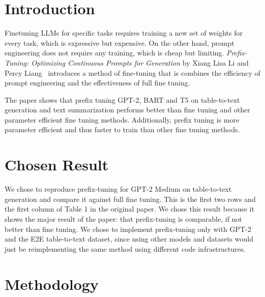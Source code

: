 \documentclass[11pt]{article} %
\author{Mac Turner, Michael Ngo, Eric Hu, Neeraj Parihar}
\begin{document}
\maketitle

\section{Introduction}
Finetuning LLMs for specific tasks requires training a new set of weights for every task, which is expressive but expensive. On the other hand, prompt engineering does not require any training, which is cheap but limiting. \textit{Prefix-Tuning: Optimizing Continuous Prompts for Generation} by Xiang Lisa Li and Percy Liang~\cite{li-liang-2021-prefix} introduces a method of fine-tuning that is combines the efficiency of prompt engineering and the effectiveness of full fine tuning.

The paper shows that prefix tuning GPT-2, BART and T5 on table-to-text generation and text summarization performs better than fine tuning and other parameter efficient fine tuning methods. Additionally, prefix tuning is more parameter efficient and thus faster to train than other fine tuning methods.

\section{Chosen Result}

We chose to reproduce prefix-tuning for GPT-2 Medium on table-to-text generation and compare it against full fine tuning. This is the first two rows and the first column of Table 1 in the original paper. We chose this result because it shows the major result of the paper: that prefix-tuning is comparable, if not better than fine tuning. We chose to implement prefix-tuning only with GPT-2 and the E2E table-to-text dataset, since using other models and datasets would just be reimplementing the same method using different code infrastructures. 


\section{Methodology}
\end{document}
